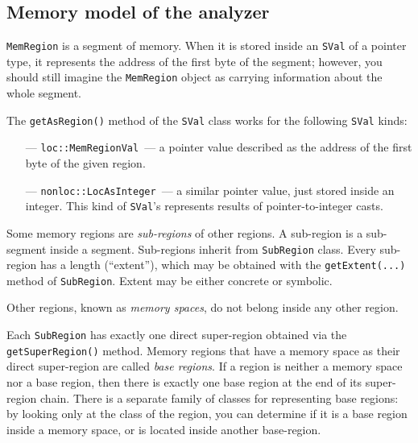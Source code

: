 \documentclass[a4paper,12pt]{article}
\begin{document}
\subsection{Memory model of the analyzer}\label{subsec:MemRegion}

\lstinline|MemRegion| is a segment of memory. When it is stored inside an \lstinline|SVal| of a pointer type, it represents the address of the first byte of the segment; however, you should still imagine the \lstinline|MemRegion| object as carrying information about the whole segment.

The \lstinline|getAsRegion()| method of the \lstinline|SVal| class works for the following \lstinline|SVal| kinds:

\begin{itemize}
\item[---]\lstinline|loc::MemRegionVal|~--- a pointer value described as the address of the first byte of the given region.
\item[---]\lstinline|nonloc::LocAsInteger|~--- a similar pointer value, just stored inside an integer. This kind of \lstinline|SVal|'s represents results of pointer-to-integer casts.
\end{itemize}


Some memory regions are \emph{sub-regions} of other regions. A sub-region is a sub-segment inside a segment. Sub-regions inherit from \lstinline|SubRegion| class. Every sub-region has a length (``extent''), which may be obtained with the \lstinline|getExtent(...)| method of \lstinline|SubRegion|. Extent may be either concrete or symbolic.

Other regions, known as \emph{memory spaces}, do not belong inside any other region.

Each \lstinline|SubRegion| has exactly one direct super-region obtained via the \lstinline|getSuperRegion()| method. Memory regions that have a memory space as their direct super-region are called \emph{base regions}. If a region is neither a memory space nor a base region, then there is exactly one base region at the end of its super-region chain. There is a separate family of classes for representing base regions: by looking only at the class of the region, you can determine if it is a base region inside a memory space, or is located inside another base-region.
\end{document}
